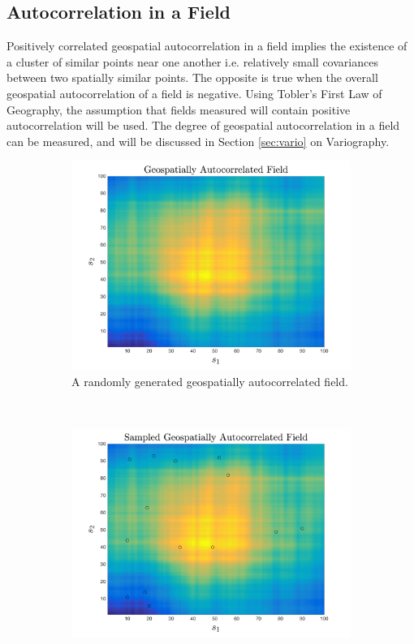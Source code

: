 \subsection{Autocorrelation in a Field}
Positively correlated geospatial autocorrelation in a field implies the existence of a cluster of similar points near one another i.e. relatively small covariances between two spatially similar points. The opposite is true when the overall geospatial autocorrelation of a field is negative. Using Tobler's First Law of Geography, the assumption that fields measured will contain positive autocorrelation will be used. The degree of geospatial autocorrelation in a field can be measured, and will be discussed in Section \ref{sec:vario} on Variography.

\begin{figure}[ht!]
    \centering
    \begin{subfigure}[t]{0.5\textwidth}
        \centering
        \includegraphics[width=\linewidth]{figures/generated_field.png}
        \captionsetup{skip=0.5\baselineskip,size=footnotesize}
        \caption{A randomly generated geospatially autocorrelated field.}
		\label{fig:gen_field}
    \end{subfigure}%
    ~ 
    \begin{subfigure}[t]{0.5\textwidth}
        \centering
        \includegraphics[width=\linewidth]{figures/sampled_generated_field.png}

\end{subfigure}
\end{figure}
